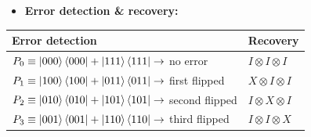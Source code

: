 \documentclass[10pt]{beamer}
\theoremstyle{remark}
\theoremstyle{definition}
\begin{document}
\begin{frame}[allowframebreaks]
    \framebreak

    \begin{itemize}
        \item \textbf{Error detection \& recovery:}
    \end{itemize}

    \begin{center}
        \begin{tabular}{ | l | l | }
            \hline
            Error detection & Recovery \\ 
            \hline
            $P_0 \equiv \ket{000}\bra{000} + \ket{111}\bra{111} \rightarrow$ no error       & $I \otimes I \otimes I$ \\
            $P_1 \equiv \ket{100}\bra{100} + \ket{011}\bra{011} \rightarrow$ first flipped  & $X \otimes I \otimes I$ \\
            $P_2 \equiv \ket{010}\bra{010} + \ket{101}\bra{101} \rightarrow$ second flipped & $I \otimes X \otimes I$ \\
            $P_3 \equiv \ket{001}\bra{001} + \ket{110}\bra{110} \rightarrow$ third flipped  & $I \otimes I \otimes X$ \\
            \hline
       \end{tabular}
    \end{center}
\end{frame}
\end{document}

